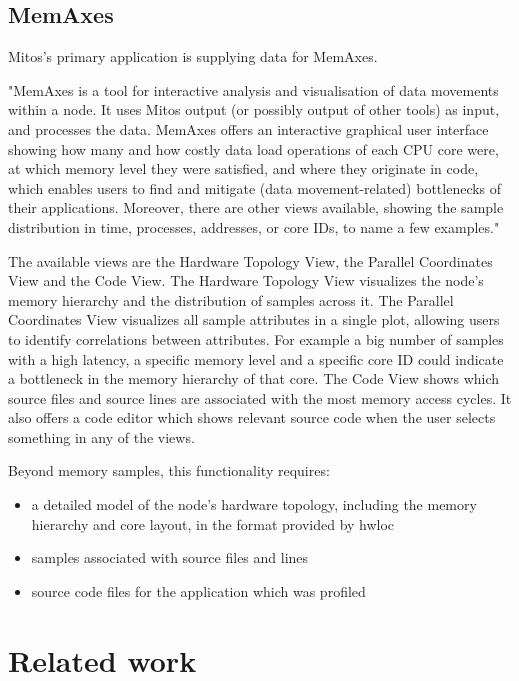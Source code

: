 \subsection{MemAxes}\label{subsec:memaxes}

Mitos's primary application is supplying data for MemAxes. 

"MemAxes is a tool for interactive analysis and visualisation of data movements within a node. It uses Mitos output (or possibly output of other tools) as input, and processes the data. MemAxes offers an interactive graphical user interface showing how many and how costly data load operations of each CPU core were, at which memory level they were satisfied, and where they originate in code, which enables users to find and mitigate (data movement-related) bottlenecks of their applications. Moreover, there are other views available, showing the sample distribution in time, processes, addresses, or core IDs, to name a few examples."\cite{DEEPSEA}

The available views are the Hardware Topology View, the Parallel Coordinates View and the Code View. The Hardware Topology View visualizes the node's memory hierarchy and the distribution of samples across it. The Parallel Coordinates View visualizes all sample attributes in a single plot, allowing users to identify correlations between attributes. For example a big number of samples with a high latency, a specific memory level and a specific core ID could indicate a bottleneck in the memory hierarchy of that core. The Code View shows which source files and source lines are associated with the most memory access cycles. It also offers a code editor which shows relevant source code when the user selects something in any of the views.\cite{Schenk2023, memaxes}

Beyond memory samples, this functionality requires:
\begin{itemize}
    \item a detailed model of the node's hardware topology, including the memory hierarchy and core layout, in the format provided by hwloc\cite{hwloc}
    \item samples associated with source files and lines
    \item source code files for the application which was profiled
\end{itemize}


\section{Related work}\label{sec:related-work}

